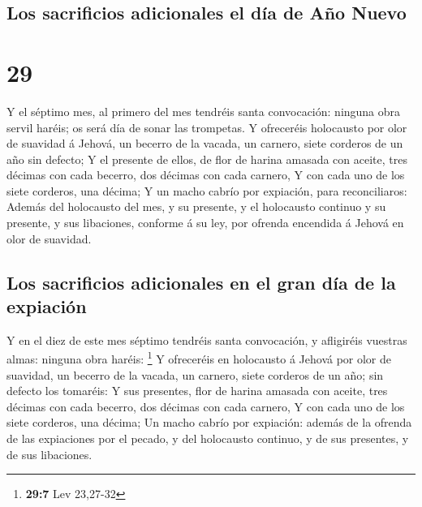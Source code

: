 \hypertarget{los-sacrificios-adicionales-el-duxeda-de-auxf1o-nuevo}{%
\subsection{Los sacrificios adicionales el día de Año
Nuevo}\label{los-sacrificios-adicionales-el-duxeda-de-auxf1o-nuevo}}

\hypertarget{section-28}{%
\section{29}\label{section-28}}

 Y el séptimo mes, al primero del mes tendréis santa
convocación: ninguna obra servil haréis; os será día de sonar las
trompetas.  Y ofreceréis holocausto por olor de suavidad á
Jehová, un becerro de la vacada, un carnero, siete corderos de un año
sin defecto;  Y el presente de ellos, de flor de harina
amasada con aceite, tres décimas con cada becerro, dos décimas con cada
carnero,  Y con cada uno de los siete corderos, una
décima;  Y un macho cabrío por expiación, para
reconciliaros:  Además del holocausto del mes, y su
presente, y el holocausto continuo y su presente, y sus libaciones,
conforme á su ley, por ofrenda encendida á Jehová en olor de suavidad.

\hypertarget{los-sacrificios-adicionales-en-el-gran-duxeda-de-la-expiaciuxf3n}{%
\subsection{Los sacrificios adicionales en el gran día de la
expiación}\label{los-sacrificios-adicionales-en-el-gran-duxeda-de-la-expiaciuxf3n}}

 Y en el diez de este mes séptimo tendréis santa
convocación, y afligiréis vuestras almas: ninguna obra haréis:
\footnote{\textbf{29:7} Lev 23,27-32}  Y ofreceréis en
holocausto á Jehová por olor de suavidad, un becerro de la vacada, un
carnero, siete corderos de un año; sin defecto los tomaréis:
 Y sus presentes, flor de harina amasada con aceite, tres
décimas con cada becerro, dos décimas con cada carnero, 
Y con cada uno de los siete corderos, una décima;  Un
macho cabrío por expiación: además de la ofrenda de las expiaciones por
el pecado, y del holocausto continuo, y de sus presentes, y de sus
libaciones.

